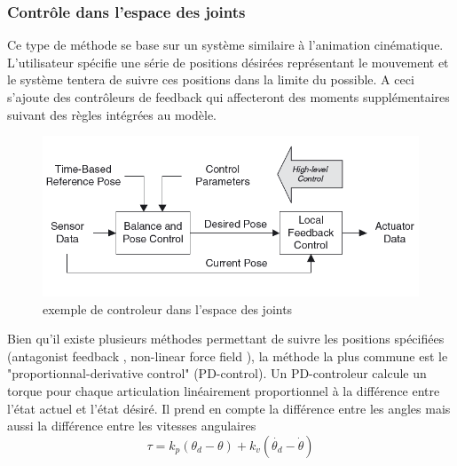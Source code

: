 \documentclass{llncs}
\begin{document}
	\subsubsection{Contrôle dans l'espace des joints} 
Ce type de méthode se base sur un système similaire à l'animation cinématique. L'utilisateur spécifie une série de positions désirées représentant le mouvement et le système tentera de suivre ces positions dans la limite du possible. A ceci s'ajoute des contrôleurs de feedback qui affecteront des moments supplémentaires suivant des règles intégrées au modèle.
\begin{figure}[h]
    \centering
    \includegraphics[scale=0.5]{joint_space_motion_control.png}
    \caption{exemple de controleur dans l'espace des joints \cite{geijtenbeek2012interactive}}
    \label{fig:joint_space_motion_control}
\end{figure}



Bien qu'il existe plusieurs méthodes permettant de suivre les positions spécifiées (antagonist feedback \cite{neff2002modeling}, non-linear force field \cite{mussa1997nonlinear}), la méthode la plus commune est le "proportionnal-derivative control" (PD-control). Un PD-controleur calcule un torque pour chaque articulation linéairement proportionnel à la différence entre l'état actuel et l'état désiré.  Il prend en compte la différence entre les angles mais aussi la différence entre les vitesses angulaires 
\[
\tau=k_p(\theta_d - \theta) + k_v(\dot{\theta_d} - \dot{\theta})
\]
\end{document}
